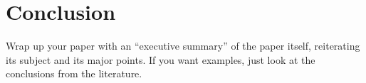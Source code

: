 \documentclass{article}
\begin{document}
\section{Conclusion}

Wrap up your paper with an ``executive summary'' of the paper itself, reiterating its subject and its major points.  If you want examples, just look at the conclusions from the literature.



\end{document}
